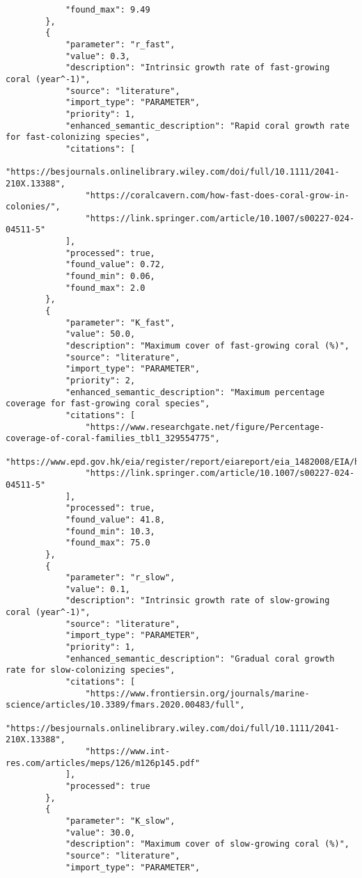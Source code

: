 \begin{lstlisting}
            "found_max": 9.49
        },
        {
            "parameter": "r_fast",
            "value": 0.3,
            "description": "Intrinsic growth rate of fast-growing coral (year^-1)",
            "source": "literature",
            "import_type": "PARAMETER",
            "priority": 1,
            "enhanced_semantic_description": "Rapid coral growth rate for fast-colonizing species",
            "citations": [
                "https://besjournals.onlinelibrary.wiley.com/doi/full/10.1111/2041-210X.13388",
                "https://coralcavern.com/how-fast-does-coral-grow-in-colonies/",
                "https://link.springer.com/article/10.1007/s00227-024-04511-5"
            ],
            "processed": true,
            "found_value": 0.72,
            "found_min": 0.06,
            "found_max": 2.0
        },
        {
            "parameter": "K_fast",
            "value": 50.0,
            "description": "Maximum cover of fast-growing coral (%)",
            "source": "literature",
            "import_type": "PARAMETER",
            "priority": 2,
            "enhanced_semantic_description": "Maximum percentage coverage for fast-growing coral species",
            "citations": [
                "https://www.researchgate.net/figure/Percentage-coverage-of-coral-families_tbl1_329554775",
                "https://www.epd.gov.hk/eia/register/report/eiareport/eia_1482008/EIA/html/Text/S11_Marine%20Ecology.htm",
                "https://link.springer.com/article/10.1007/s00227-024-04511-5"
            ],
            "processed": true,
            "found_value": 41.8,
            "found_min": 10.3,
            "found_max": 75.0
        },
        {
            "parameter": "r_slow",
            "value": 0.1,
            "description": "Intrinsic growth rate of slow-growing coral (year^-1)",
            "source": "literature",
            "import_type": "PARAMETER",
            "priority": 1,
            "enhanced_semantic_description": "Gradual coral growth rate for slow-colonizing species",
            "citations": [
                "https://www.frontiersin.org/journals/marine-science/articles/10.3389/fmars.2020.00483/full",
                "https://besjournals.onlinelibrary.wiley.com/doi/full/10.1111/2041-210X.13388",
                "https://www.int-res.com/articles/meps/126/m126p145.pdf"
            ],
            "processed": true
        },
        {
            "parameter": "K_slow",
            "value": 30.0,
            "description": "Maximum cover of slow-growing coral (%)",
            "source": "literature",
            "import_type": "PARAMETER",

\end{lstlisting}
